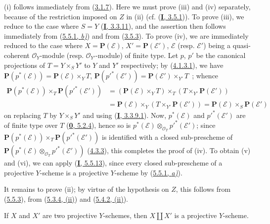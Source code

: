 (i) follows immediately from (\hyperref[II.3.1.7]{3.1.7}). Here we must
prove (iii) and (iv) separately, because of the restriction imposed on
$Z$ in (ii) (cf. (\hyperref[I.3.5.1]{\textbf{I}, 3.5.1})). To prove (iii), we
reduce to the case where $S=Y$ (\hyperref[I.3.3.11]{\textbf{I}, 3.3.11}), and the
assertion then follows immediately from (\hyperref[II.5.5.1]{5.5.1, \emph{b)}})
and from (\hyperref[II.3.5.3]{3.5.3}). To prove (iv), we are immediately
reduced to the case where $X=\mathbf{P}(\mathcal{E})$,
$X'=\mathbf{P}(\mathcal{E}')$, $\mathcal{E}$ (resp. $\mathcal{E}'$) being a
quasi-coherent $\mathcal{O}_Y$-module (resp. $\mathcal{O}_{Y'}$-module) of
finite type. Let $p$, $p'$ be the canonical projections of $T=Y\times_SY'$
to $Y$ and $Y'$ respectively; by (\hyperref[II.4.1.3.1]{4.1.3.1}), we have
$\mathbf{P}(p^*(\mathcal{E}))=\mathbf{P}(\mathcal{E})\times_YT$,
$\mathbf{P}(p'^*(\mathcal{E}'))=\mathbf{P}(\mathcal{E}')\times_{Y'}T$~; whence
\begin{align*}
\mathbf{P}(p^*(\mathcal{E}))\times_T\mathbf{P}(p'^*(\mathcal{E}'))
&=(\mathbf{P}(\mathcal{E})\times_YT)\times_T
(T\times_{Y'}\mathbf{P}(\mathcal{E}'))\\
&=\mathbf{P}(\mathcal{E})\times_Y
(T\times_{Y'}\mathbf{P}(\mathcal{E}'))
=\mathbf{P}(\mathcal{E})\times_S\mathbf{P}(\mathcal{E}')
\end{align*}
on replacing $T$ by $Y\times_SY'$ and using
(\hyperref[I.3.3.9.1]{\textbf{I}, 3.3.9.1}). Now, $p^*(\mathcal{E})$ and
$p'^*(\mathcal{E}')$ are of finite type over $T$
(\hyperref[0.5.2.4]{\textbf{0}, 5.2.4}), hence so is
$p^*(\mathcal{E})\otimes_{\mathcal{O}_T}p'^*(\mathcal{E}')$; since
$\mathbf{P}(p^*(\mathcal{E}))\times_T\mathbf{P}(p'^*(\mathcal{E}'))$
is identified with a closed sub-prescheme of
$\mathbf{P}(p^*(\mathcal{E})\otimes_{\mathcal{O}_T}p'^*(\mathcal{E}'))$
(\hyperref[II.4.3.3]{4.3.3}), this completes the proof of (iv). To obtain
(v) and (vi), we can apply (\hyperref[I.5.5.13]{\textbf{I}, 5.5.13}), since every
closed sub-prescheme of a projective $Y$-scheme is a projective $Y$-scheme by
(\hyperref[II.5.5.1]{5.5.1, \emph{a)}}).

It remains to prove (ii); by virtue of the hypothesis on $Z$, this follows
from (\hyperref[II.5.5.3]{5.5.3}), from
(\hyperref[II.5.3.4]{5.3.4, (ii)}) and
(\hyperref[II.5.4.2]{5.4.2, (ii)}).

\begin{proposition}[5.5.6]
\label{II.5.5.6}
If $X$ and $X'$ are two projective $Y$-schemes, then $X\amalg X'$ is a
projective $Y$-scheme.
\end{proposition}

